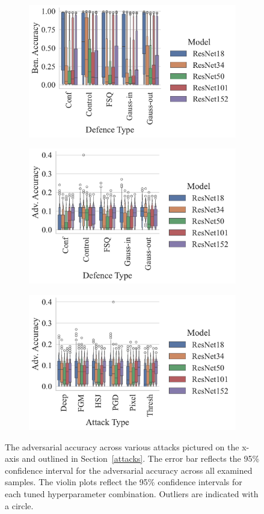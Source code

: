 \label{results}
\begin{figure}[!h]
\begin{subfigure}
    \centering
    \includegraphics[trim={0 5pt 0 10pt},clip,width=.45\textwidth]{plots/ben_accuracy_vs_defence_type.pdf}
\end{subfigure}
\begin{subfigure}
    \centering
    \includegraphics[trim={0 5pt 0 10pt},clip,width=.45\textwidth]{plots/adv_accuracy_vs_defence_type.pdf}
\end{subfigure}
\begin{subfigure}
    \centering
    \includegraphics[trim={0 5pt 0 10pt},clip,width=.45\textwidth]{plots/adv_accuracy_vs_attack_type.pdf}
\end{subfigure}
\caption{The adversarial accuracy across various attacks pictured on the x-axis and outlined in Section~\ref{attacks}. The error bar reflects the 95\% confidence interval for the adversarial accuracy across all examined samples. The violin plots reflect the 95\% confidence intervals for each tuned hyperparameter combination. Outliers are indicated with a circle.}
\label{fig:accuracies}
\end{figure}



